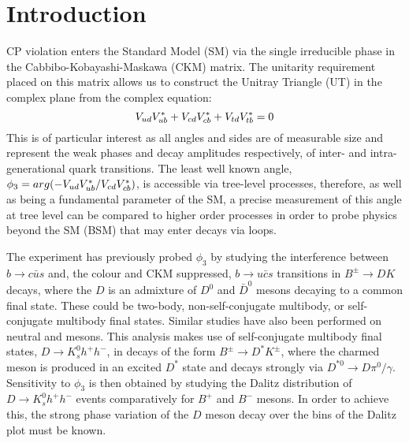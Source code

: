 
\section{Introduction}
\label{sec:introduction}

CP violation enters the Standard Model (SM) via the single irreducible phase in the Cabbibo-Kobayashi-Maskawa (CKM) matrix. The unitarity requirement placed on this matrix allows us to construct the Unitray Triangle (UT) in the complex plane from the complex equation:
\begin{equation}
{\ensuremath{V_{{u}{d}}}}{\ensuremath{V_{{u}{b}}^\ast}}+{V_{{c}{d}}}{V_{{c}{b}}^\ast}+{V_{{t}{d}}}{V_{{t}{b}}^\ast}=0
\end{equation}
This is of particular interest as all angles and sides are of measurable size and represent the weak phases and decay amplitudes respectively, of inter- and intra-generational quark transitions. The least well known angle, $\phi_3=arg(-{V_{{u}{d}}}{V_{{u}{b}}^\ast}/{V_{{c}{d}}}{V_{{c}{b}}^\ast})$, is accessible
via tree-level processes, therefore, as well as being a fundamental parameter of the SM, a precise measurement of this angle at tree level can be compared to higher order processes in order to probe physics beyond the SM (BSM) that may enter decays via loops.

The \lhcb experiment has previously probed $\phi_3$ by studying the interference between $b\rightarrow c\bar{u}s$ and, the colour and CKM suppressed, $b\rightarrow u\bar{c}s$ transitions in $B^{\pm}\rightarrow DK$ decays, where the $D$ is an admixture of $D^{0}$ and $\bar{D}^{0}$ mesons decaying to a common final state. These could be two-body, non-self-conjugate multibody, or self-conjugate multibody final states. Similar studies have also been performed on neutral \Bz and \Bs mesons. This
analysis makes use of self-conjugate multibody final states, $D\rightarrow K^0_sh^+h^-$, in decays of the form
$B^{\pm}\rightarrow D^{*}K^{\pm}$, where the charmed meson is produced in an excited $D^*$ state and decays strongly via $D^{*0}\rightarrow D\pi^0 / \gamma$. Sensitivity to $\phi_3$ is then obtained by studying the Dalitz distribution of $D\rightarrow K^0_sh^+h^-$ events comparatively for $B^+$ and $B^-$ mesons. In order to achieve this, the strong phase variation of the $D$ meson decay over the bins of the Dalitz plot must be known.


